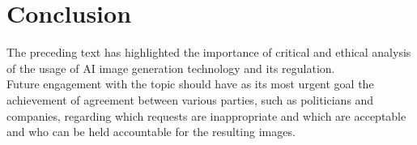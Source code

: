 \documentclass[10pt,twocolumn,twoside]{osajnl}
\begin{document}
\section{Conclusion}
The preceding text has highlighted the importance of critical and ethical analysis of the usage of AI image generation technology and its regulation.\\
Future engagement with the topic should have as its most urgent goal the achievement of agreement between various parties, such as politicians and companies, regarding which requests are inappropriate and which are acceptable and who can be held accountable for the resulting images. 
 


\bigskip


%

\end{document}
